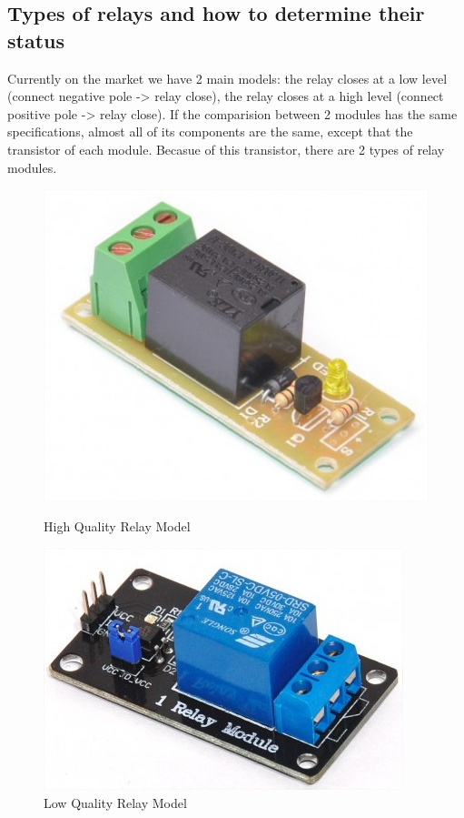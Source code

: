 \documentclass[a4paper]{report}
\begin{document}
    \subsection{Types of relays and how to determine their status}
        Currently on the market we have 2 main models: the relay closes at a low level (connect negative pole -> relay close), 
        the relay closes at a high level (connect positive pole -> relay close). If the comparision between 
        2 modules has the same specifications, almost all of its components are the same, except that 
        the transistor of each module. Becasue of this transistor, there are 2 types of relay modules.
        \begin{figure}
            \centering
            \includegraphics[width=\linewidth]{relay1.jpg}
            \caption{\label{fig:boat}High Quality Relay Model}
            \includegraphics[width=\linewidth]{relay2.jpg}
            \caption{\label{fig:boat}Low Quality Relay Model}
        \end{figure}
        \newpage
\end{document}
